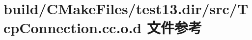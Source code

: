 \hypertarget{test13_8dir_2src_2TcpConnection_8cc_8o_8d}{}\section{build/\+C\+Make\+Files/test13.dir/src/\+Tcp\+Connection.cc.\+o.\+d 文件参考}
\label{test13_8dir_2src_2TcpConnection_8cc_8o_8d}
